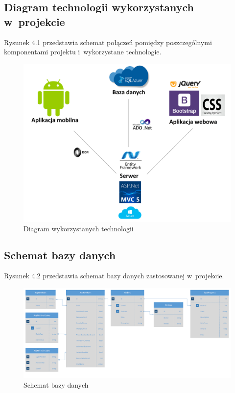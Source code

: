 \documentclass[a4paper,11pt]{article}
\begin{document}
\subsection{Diagram technologii wykorzystanych w~projekcie}
Rysunek 4.1 przedstawia schemat połączeń pomiędzy poszczególnymi komponentami projektu i~wykorzystane technologie.
\begin{figure}[H]
	\centering
	\includegraphics[width=\textwidth,height=0.6\textheight]{diagramTechnologii.png}
	\caption{Diagram wykorzystanych technologii}
\end{figure}
\begin{landscape}
\subsection{Schemat bazy danych}
Rysunek 4.2 przedstawia schemat bazy danych zastosowanej w~projekcie.

\begin{figure}[h!]
	\centering
	\includegraphics[width=1.3\textwidth,height=0.8\textheight]{dbSchema.png}
	\caption{Schemat bazy danych}
\end{figure}
\end{landscape}
\end{document}
